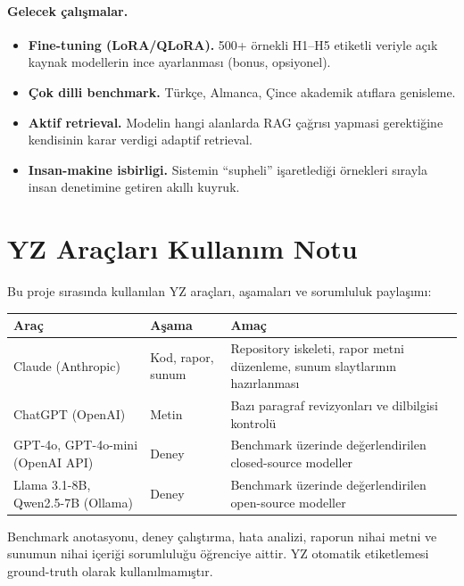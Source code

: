 \documentclass[11pt,a4paper]{article}
\begin{document}
\paragraph{Gelecek çalışmalar.}
\begin{itemize}[nosep]
\item \textbf{Fine-tuning (LoRA/QLoRA).} 500+ örnekli H1--H5 etiketli veriyle
açık kaynak modellerin ince ayarlanması (bonus, opsiyonel).
\item \textbf{Çok dilli benchmark.} Türkçe, Almanca, Çince akademik atıflara
genisleme.
\item \textbf{Aktif retrieval.} Modelin hangi alanlarda RAG çağrısı yapmasi
gerektiğine kendisinin karar verdigi adaptif retrieval.
\item \textbf{Insan-makine isbirligi.} Sistemin ``supheli'' işaretlediği
örnekleri sırayla insan denetimine getiren akıllı kuyruk.
\end{itemize}

\printbibliography[heading=bibnumbered, title={Kaynakça}]

\appendix

\section{YZ Araçları Kullanım Notu}
\label{appx:ai}
Bu proje sırasında kullanılan YZ araçları, aşamaları ve sorumluluk paylaşımı:

\begin{tabularx}{\columnwidth}{l l X}
\toprule
\textbf{Araç} & \textbf{Aşama} & \textbf{Amaç} \\
\midrule
Claude (Anthropic) & Kod, rapor, sunum & Repository iskeleti, rapor metni düzenleme, sunum slaytlarının hazırlanması \\
ChatGPT (OpenAI)   & Metin             & Bazı paragraf revizyonları ve dilbilgisi kontrolü \\
GPT-4o, GPT-4o-mini (OpenAI API) & Deney & Benchmark üzerinde değerlendirilen closed-source modeller \\
Llama 3.1-8B, Qwen2.5-7B (Ollama) & Deney & Benchmark üzerinde değerlendirilen open-source modeller \\
\bottomrule
\end{tabularx}

\noindent Benchmark anotasyonu, deney çalıştırma, hata analizi, raporun nihai metni
ve sunumun nihai içeriği sorumluluğu öğrenciye aittir. YZ otomatik
etiketlemesi ground-truth olarak kullanılmamıştır.
\end{document}
